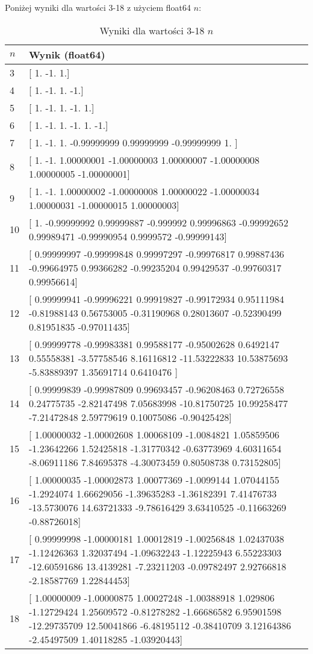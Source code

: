 \documentclass{article}
\begin{document}
Poniżej wyniki dla wartości 3-18 z użyciem float64 $n$:
\begin{table}[H]
\centering
\begin{tabular}{|l|p{11cm}|}
\hline
$n$ & Wynik (float64)\\ \hline
3 & [ 1. -1.  1.] \\ \hline
4 & [ 1. -1.  1. -1.] \\ \hline
5 & [ 1. -1.  1. -1.  1.] \\ \hline
6 & [ 1. -1.  1. -1.  1. -1.] \\ \hline
7 & [ 1.     -1.      1.     -0.99999999  0.99999999 -0.99999999  1. ] \\ \hline
8 & [ 1.         -1.          1.00000001 -1.00000003  1.00000007 -1.00000008 1.00000005 -1.00000001] \\ \hline
9 & [ 1.         -1.          1.00000002 -1.00000008  1.00000022 -1.00000034 1.00000031 -1.00000015  1.00000003] \\ \hline
10 & [ 1.         -0.99999992  0.99999887 -0.999992    0.99996863 -0.99992652 0.99989471 -0.99990954  0.9999572  -0.99999143] \\ \hline
11 & [ 0.99999997 -0.99999848  0.99997297 -0.99976817  0.99887436 -0.99664975 0.99366282 -0.99235204  0.99429537 -0.99760317  0.99956614] \\ \hline
12 & [ 0.99999941 -0.99996221  0.99919827 -0.99172934  0.95111984 -0.81988143 0.56753005 -0.31190968  0.28013607 -0.52390499  0.81951835 -0.97011435] \\ \hline
13 & [  0.99999778  -0.99983381   0.99588177  -0.95002628   0.6492147
0.55558381  -3.57758546   8.16116812 -11.53222833  10.53875693
-5.83889397   1.35691714   0.6410476 ] \\ \hline
14 & [  0.99999839  -0.99987809   0.99693457  -0.96208463   0.72726558
0.24775735  -2.82147498   7.05683998 -10.81750725  10.99258477
-7.21472848   2.59779619   0.10075086  -0.90425428] \\ \hline
15 & [ 1.00000032 -1.00002608  1.00068109 -1.0084821   1.05859506 -1.23642266
1.52425818 -1.31770342 -0.63773969  4.60311654 -8.06911186  7.84695378
-4.30073459  0.80508738  0.73152805] \\ \hline
16 & [  1.00000035  -1.00002873   1.00077369  -1.0099144    1.07044155
-1.2924074    1.66629056  -1.39635283  -1.36182391   7.41476733
-13.5730076   14.63721333  -9.78616429   3.63410525  -0.11663269
-0.88726018] \\ \hline
17 & [  0.99999998  -1.00000181   1.00012819  -1.00256848   1.02437038
-1.12426363   1.32037494  -1.09632243  -1.12225943   6.55223303
-12.60591686  13.4139281   -7.23211203  -0.09782497   2.92766818
-2.18587769   1.22844453] \\ \hline
18 & [  1.00000009  -1.00000875   1.00027248  -1.00388918   1.029806
  -1.12729424   1.25609572  -0.81278282  -1.66686582   6.95901598
 -12.29735709  12.50041866  -6.48195112  -0.38410709   3.12164386
  -2.45497509   1.40118285  -1.03920443] \\ \hline
\end{tabular}
\caption{Wyniki dla wartości 3-18 $n$}
\end{table}
\end{document}
